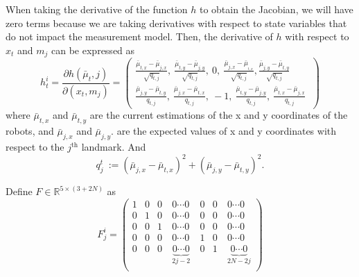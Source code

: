 When taking the derivative of the function $h$ to obtain the Jacobian, we will have zero terms because we are taking derivatives with respect to state variables that do not impact the measurement model. Then, the derivative of $h$ with respect to $x_{t}$ and $m_{j}$ can be expressed as
\begin{equation}
    h^{i}_{t} = \frac{\partial{h(\bar{\mu}_{t},j)}}{\partial{(x_{t},m_{j})}} = 
    \begin{pmatrix}
    \frac{\bar{\mu}_{t,x} - \bar{\mu}_{j,x}}{\sqrt{q_{t,j}}},\
    \frac{\bar{\mu}_{t,y} - \bar{\mu}_{j,y}}{\sqrt{q_{t,j}}},\
    0,\
    \frac{\bar{\mu}_{j,x} - \bar{\mu}__{t,x}}{\sqrt{q_{t,j}}},
    \frac{\bar{\mu}_{j,y} - \bar{\mu}_{t,y}}{\sqrt{q_{t,j}}} \\
    \frac{\bar{\mu}_{j,y} - \bar{\mu}_{t,y}}{q_{t,j}}, \
    \frac{\bar{\mu}_{j,x} - \bar{\mu}_{t,x}}{q_{t,j}}, \
    -1,\ 
    \frac{\bar{\mu}_{t,y} - \bar{\mu}_{j,y}}{q_{t,j}}, \
    \frac{\bar{\mu}_{t,x} - \bar{\mu}_{j,x}}{q_{t,j}} \
    \end{pmatrix}
\end{equation}
where $\bar{\mu}_{t,x}$ and $\bar{\mu}_{t,y}$ are the current estimations of the x and y coordinates of the robots, and $\bar{\mu}_{j,x}$ and $\bar{\mu}_{j,y}$. are the expected values of x and y coordinates with respect to the $j^{\text{th}}$ landmark. And
\begin{equation*}
    q^{t}_{j} \ := (\bar{\mu}_{j,x} - \bar{\mu}_{t,x})^{2} + (\bar{\mu}_{j,y} - \bar{\mu}_{t,y})^{2}.
\end{equation*}


\setcounter{MaxMatrixCols}{20}
Define $F \in \mathbb{R}^{5 \times (3 +2N)}$ as
\begin{equation}
    F^{i}_{j} = 
    \begin{pmatrix}
    1 & 0 & 0 & \ 0 \cdots 0 \ & 0 & 0 \ & 0 \cdots 0 \\
    0 & 1 & 0 & \ 0 \cdots 0 \ & 0 & 0 \ & 0 \cdots 0 \\
    0 & 0 & 1 & \ 0  \cdots 0 \ & 0 & 0 \ & 0 \cdots 0 \\
    0 & 0 & 0 & \ 0  \cdots 0 \ & 1 & 0 \ & 0 \cdots 0 \\
    0 & 0 & 0 & \ \underbrace{0  \cdots 0}_{2j-2} \ & 0 & 1 \ & \underbrace{0 \cdots 0}_{2N-2j} \\
    \end{pmatrix}
\end{equation}


